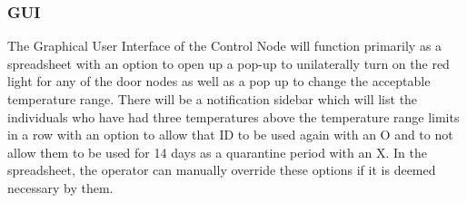 \subsubsection{GUI}
The Graphical User Interface of the Control Node will function primarily as a
spreadsheet with an option to open up a pop-up to unilaterally turn on the red
light for any of the door nodes as well as a pop up to change the acceptable
temperature range. There will be a notification sidebar which will list the
individuals who have had three temperatures above the temperature range limits
in a row with an option to allow that ID to be used again with an O and to not
allow them to be used for 14 days as a quarantine period with an X. In the
spreadsheet, the operator can manually override these options if it is deemed
necessary by them.

